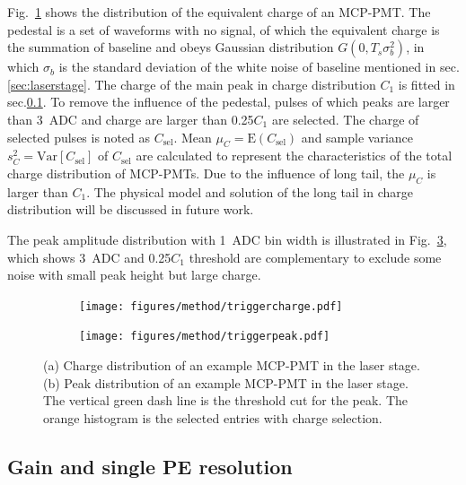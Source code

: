 Fig.~\ref{fig:triggercharge} shows the distribution of the equivalent charge of an MCP-PMT. The pedestal is a set of waveforms with no signal, of which the equivalent charge is the summation of baseline and obeys Gaussian distribution $G(0, T_s\sigma_b^2)$, in which $\sigma_b$ is the standard deviation of the white noise of baseline mentioned in sec.\ref{sec:laserstage}. The charge of the main peak in charge distribution $C_1$ is fitted in sec.\ref{sec:noisegain}. To remove the influence of the pedestal, pulses of which peaks are larger than \SI{3}{ADC} and charge are larger than 0.25$C_1$ are selected. The charge of selected pulses is noted as $C_{\mathrm{sel}}$. Mean $\mu_{C}=\mathrm{E}(C_{\mathrm{sel}})$ and sample variance $s^2_{C}=\mathrm{Var}[C_{\mathrm{sel}}]$ of $C_{\mathrm{sel}}$ are calculated to represent the characteristics of the total charge distribution of MCP-PMTs. Due to the influence of long tail, the $\mu_{C}$ is larger than $C_1$. The physical model and solution of the long tail in charge distribution will be discussed in future work.

The peak amplitude distribution with \SI{1}{ADC} bin width is illustrated in Fig.~\ref{fig:triggerpeak}, which shows \SI{3}{ADC} and 0.25$C_1$ threshold are complementary to exclude some noise with small peak height but large charge.

\begin{figure}[!htbp]
    \centering
    \begin{subfigure}[b]{\SF\textwidth}
        \texttt{[image: figures/method/triggercharge.pdf]}
        \caption{}%
        \label{fig:triggercharge}
    \end{subfigure}
    \begin{subfigure}[b]{\SF\textwidth}
        \texttt{[image: figures/method/triggerpeak.pdf]}
        \caption{}%
        \label{fig:triggerpeak}
    \end{subfigure}
    \caption{(a) Charge distribution of an example MCP-PMT in the laser stage. (b) Peak distribution of an example MCP-PMT in the laser stage. The vertical green dash line is the threshold cut for the peak. The orange histogram is the selected entries with charge selection.}
\end{figure}

\subsection{Gain and single PE resolution}
\label{sec:noisegain}

